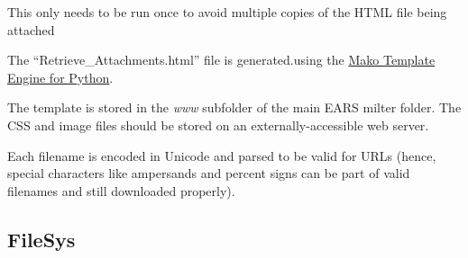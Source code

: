 \documentclass[letterpaper,10pt,english]{sphinxmanual}
\begin{document}
\begin{fulllineitems}
\begin{fulllineitems}
This only needs to be run once to avoid multiple copies of the HTML file being attached

\end{fulllineitems}


\begin{fulllineitems}
\label{codedocs/EARSmilter:EARSmilter.EARSmilter.ProcessMessage.mako_notice}
The ``Retrieve\_Attachments.html'' file is generated.using the \href{http://www.makotemplates.org/}{Mako Template Engine for Python}.

The template is stored in the \emph{www} subfolder of the main EARS milter folder.  The CSS and image files should be stored on
an externally-accessible web server.

Each filename is encoded in Unicode and parsed to be valid for URLs (hence, special characters like ampersands and percent signs
can be part of valid filenames and still downloaded properly).

\end{fulllineitems}


\end{fulllineitems}



\subsection{FileSys}
\label{codedocs/EARSmilter:id4}\label{codedocs/EARSmilter:filesys}
\end{document}
